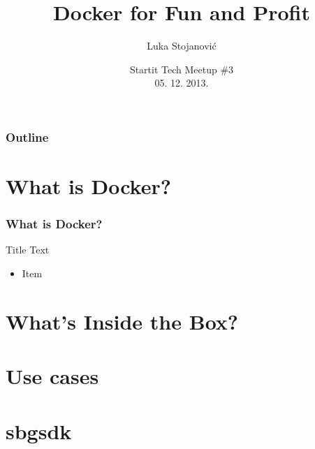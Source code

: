 \documentclass{beamer}
\title{Docker for Fun and Profit}
\author{Luka Stojanović}
\institute{
  luka@magrathea.rs \\
  Seven Bridges Genomics
}
\date{Startit Tech Meetup \#3\\ 05. 12. 2013.}
\begin{document}
  \begin{frame}
    \titlepage
  \end{frame}
  
  \begin{frame}
    \frametitle{Outline}
    \tableofcontents
  \end{frame}
  
  \section{What is Docker?}
  \begin{frame}
    \frametitle{What is Docker?}
    \begin{block}{Title}
            Text
    \end{block}
    
    \begin{itemize}
            \item Item
    \end{itemize}
    
  \end{frame}
  
  \section{What's Inside the Box?}
  \begin{frame}
    
  \end{frame}
  
  \section{Use cases}
  \begin{frame}
    
  \end{frame}
  
  \section{sbgsdk}
  \begin{frame}
    
  \end{frame}
  
\end{document}
